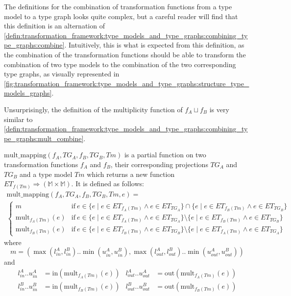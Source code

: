 The definitions for the combination of transformation functions from a type model to a type graph looks quite complex, but a careful reader will find that this definition is an alternation of \cref{defin:transformation_framework:type_models_and_type_graphs:combining_type_graphs:combine}. Intuitively, this is what is expected from this definition, as the combination of the transformation functions should be able to transform the combination of two type models to the combination of the two corresponding type graphs, as visually represented in \cref{fig:transformation_framework:type_models_and_type_graphs:structure_type_models_graphs}.

Unsurprisingly, the definition of the multiplicity function of $f_{A} \sqcup f_{B}$ is very similar to \cref{defin:transformation_framework:type_models_and_type_graphs:combining_type_graphs:mult_combine}.

\begin{defin}
\label{defin:transformation_framework:type_models_and_type_graphs:combining_transformation_functions:mult_mapping}
$\mathrm{mult\_\!mapping}(f_A, TG_A, f_B, TG_B, Tm)$ is a partial function on two transformation functions $f_A$ and $f_B$, their corresponding projections $TG_A$ and $TG_B$ and a type model $Tm$ which returns a new function \\$ET_{f(Tm)} \Rightarrow (\mathbb{M} \times \mathbb{M})$. It is defined as follows:
\begin{multline*}
    \mathrm{mult\_\!mapping}(f_A, TG_A, f_B, TG_B, Tm, e) = \\
        \begin{cases}
        m & \mathrm{if }\ e \in \{e \mid e \in ET_{f_{A}(Tm)} \land e \in ET_{TG_A} \} \cap \{e \mid e \in ET_{f_{B}(Tm)} \land e \in ET_{TG_B} \} \\
        \mathrm{mult}_{f_A(Tm)}(e) & \mathrm{if }\ e \in \{e \mid e \in ET_{f_{A}(Tm)} \land e \in ET_{TG_A} \} \setminus \{e \mid e \in ET_{f_{B}(Tm)} \land e \in ET_{TG_B} \} \\
        \mathrm{mult}_{f_B(Tm)}(e) & \mathrm{if }\ e \in \{e \mid e \in ET_{f_{B}(Tm)} \land e \in ET_{TG_B} \} \setminus \{e \mid e \in ET_{f_{A}(Tm)} \land e \in ET_{TG_A} \}
    \end{cases}
\end{multline*}
where
\begin{equation*}
    m = ( \max(l_{in}^A, l_{in}^B)..\min(u_{in}^A, u_{in}^B), \max(l_{out}^A, l_{out}^B)..\min(u_{out}^A, u_{out}^B) )
\end{equation*}
and
\begin{align*}
    l_{in}^A .. u_{in}^A &= \mathrm{in}(\mathrm{mult}_{f_A(Tm)}(e)) &
    l_{out}^A .. u_{out}^A &= \mathrm{out}(\mathrm{mult}_{f_A(Tm)}(e)) \\
    l_{in}^B .. u_{in}^B &= \mathrm{in}(\mathrm{mult}_{f_B(Tm)}(e)) &
    l_{out}^B .. u_{out}^B &= \mathrm{out}(\mathrm{mult}_{f_B(Tm)}(e))
\end{align*}
\end{defin}


